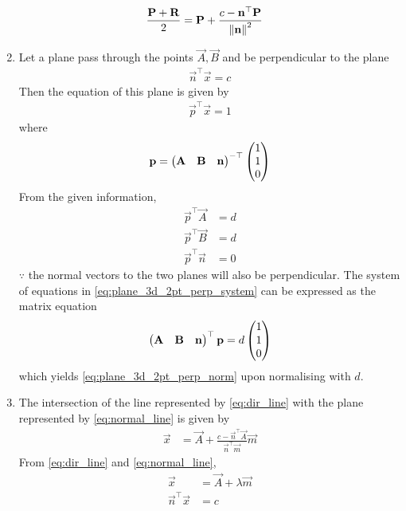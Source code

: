 \documentclass[journal,12pt,twocolumn]{IEEEtran}
\renewcommand\thesection{\arabic{section}}
\renewcommand\thesubsection{\thesection.\arabic{subsection}}
\begin{document}
\begin{enumerate}[label=\thesubsection.\arabic*.,ref=\thesubsection.\theenumi]
\begin{align}
			\frac{\mathbf{P}+\mathbf{R}}{2} &=
	  \mathbf{P} + \frac{c - \mathbf{n}^{\top}\mathbf{P}}{\left\lVert\mathbf{n}\right\rVert^2}
		\end{align}
		\item Let a plane pass through the points $\vec{A},\vec{B}$ and be perpendicular to the plane 
		\begin{align}
		\vec{n}^{\top}\vec{x} =c 
			\label{eq:plane_3d_2pt_perp_given}
		\end{align}
		Then the equation of this plane is given by 
		\begin{align}
		\vec{p}^{\top}\vec{x} = 1
			\label{eq:plane_3d_2pt}
		\end{align}
		where
		\begin{align}
			\mathbf{p} = 		\begin{pmatrix}\mathbf{A} & \mathbf{B} & \mathbf{n}\end{pmatrix}^{-\top}  \begin{pmatrix}1 \\ 1 \\ 0\end{pmatrix}
			\label{eq:plane_3d_2pt_perp_norm}
		\end{align}
	\solution From the given information, 
		\begin{align}
			\vec{p}^{\top}\vec{A} &=d 
			\\
			\vec{p}^{\top}\vec{B} &=d 
			\\
			\vec{p}^{\top}\vec{n} &= 0
			\label{eq:plane_3d_2pt_perp_system}
		\end{align}
		$\because$ the normal vectors to the two planes will also be perpendicular.  The system of equations in 
			\eqref{eq:plane_3d_2pt_perp_system}
			can be expressed as the matrix equation
		\begin{align}
			\begin{pmatrix}\mathbf{A} & \mathbf{B} & \mathbf{n}\end{pmatrix}^{\top}\mathbf{p} = d\begin{pmatrix}1 \\ 1 \\ 0\end{pmatrix}
			\label{eq:plane_3d_2pt_perp_system_temp}
		\end{align}
		which yields 
			\eqref{eq:plane_3d_2pt_perp_norm}
			upon normalising with $d$.
		\item The intersection of the line represented by 
	\eqref{eq:dir_line}
	with the plane represented by 
	\eqref{eq:normal_line}
	is given by 
\begin{align}
	\label{eq:dir_line_plane_isect}
	\vec{x} &= \vec{A} + \frac{c - \vec{n}^{\top}\vec{A}}{\vec{n}^{\top}\vec{m}}
\vec{m}
\end{align}
\solution From 
	\eqref{eq:dir_line}
	and 
	\eqref{eq:normal_line},
\begin{align}
	\vec{x} &= \vec{A} + \lambda \vec{m}
	\\
	\vec{n}^{\top}\vec{x} &= c
	\\

\end{align}
\end{enumerate}
\end{document}
